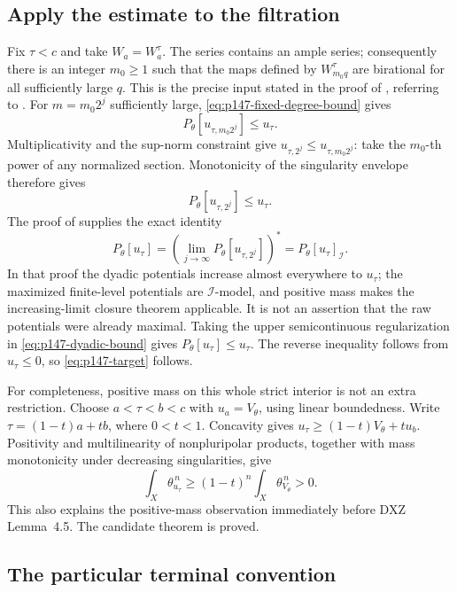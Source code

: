 \subsection{Apply the estimate to the filtration}

Fix \(\tau<c\) and take \(W_a=W_a^\tau\).
The series contains an ample series; consequently there is an integer
\(m_0\geq1\) such that the maps defined by \(W_{m_0q}^\tau\) are birational
for all sufficiently large \(q\).
This is the precise input stated in the proof of
\cite[Proposition~4.6]{DXZ23}, referring to \cite[Lemma~1.6]{BC11}.
For \(m=m_0 2^j\) sufficiently large,
\eqref{eq:p147-fixed-degree-bound} gives
\[
                    P_\theta[u_{\tau,m_0 2^j}]\leq u_\tau.
\]
Multiplicativity and the sup-norm constraint give
\(u_{\tau,2^j}\leq u_{\tau,m_0 2^j}\): take the \(m_0\)-th power of any
normalized section.  Monotonicity of the singularity envelope therefore
gives
\begin{equation}\label{eq:p147-dyadic-bound}
                         P_\theta[u_{\tau,2^j}]\leq u_\tau.
\end{equation}
The proof of \cite[Lemma~4.5]{DXZ23} supplies the exact identity
\[
 P_\theta[u_\tau]
      =\left(\lim_{j\to\infty}P_\theta[u_{\tau,2^j}]\right)^*
      =P_\theta[u_\tau]_{\mathcal I}.
\]
In that proof the dyadic potentials increase almost everywhere to
\(u_\tau\); the maximized finite-level potentials are \(\mathcal I\)-model,
and positive mass makes the increasing-limit closure theorem applicable.
It is not an assertion that the raw potentials were already maximal.
Taking the upper semicontinuous regularization in
\eqref{eq:p147-dyadic-bound} gives \(P_\theta[u_\tau]\leq u_\tau\).
The reverse inequality follows from \(u_\tau\leq0\), so
\eqref{eq:p147-target} follows.

For completeness, positive mass on this whole strict interior is not an
extra restriction.  Choose \(a<\tau<b<c\) with \(u_a=V_\theta\), using
linear boundedness.  Write \(\tau=(1-t)a+tb\), where \(0<t<1\).
Concavity gives
\(u_\tau\geq(1-t)V_\theta+t u_b\).
Positivity and multilinearity of nonpluripolar products, together with
mass monotonicity under decreasing singularities, give
\[
       \int_X\theta_{u_\tau}^{\,n}
                    \geq(1-t)^n\int_X\theta_{V_\theta}^{\,n}>0.
\]
This also explains the positive-mass observation immediately before
DXZ Lemma~4.5.  The candidate theorem is proved.

\subsection{The particular terminal convention}

